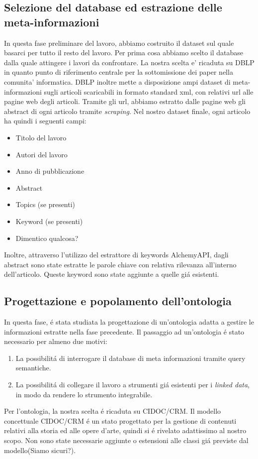 \documentclass[11pt,twoside,a4paper]{article}
\begin{document}
\subsection{Selezione del database ed estrazione delle meta-informazioni}
\label{subsec:infoextraction}
In questa fase preliminare del lavoro, abbiamo costruito il dataset sul quale basarci per tutto il resto del lavoro. Per prima cosa abbiamo scelto il database dalla quale attingere i lavori da confrontare. La nostra scelta e' ricaduta su DBLP\cite{DBLP} in quanto punto di riferimento centrale per la sottomissione dei paper nella comunita' informatica. DBLP inoltre mette a disposizione ampi dataset di meta-informazioni sugli articoli scaricabili in formato standard xml, con relativi url alle pagine web degli articoli.
Tramite gli url, abbiamo estratto dalle pagine web gli abstract di ogni articolo tramite \emph{scraping}. Nel nostro dataset finale, ogni articolo ha quindi i seguenti campi:
\begin{itemize}
	\item Titolo del lavoro
	\item Autori del lavoro
	\item Anno di pubblicazione
	\item Abstract
	\item Topics (se presenti)
	\item Keyword (se presenti)
	\item Dimentico qualcosa?
\end{itemize} 
Inoltre, attraverso l'utilizzo del estrattore di keywords AlchemyAPI, dagli abstract sono state estratte le parole chiave con relativa rilevanza all'interno dell'articolo. Queste keyword sono state aggiunte a quelle gi\'a esistenti.

\subsection{Progettazione e popolamento dell'ontologia}
\label{subsec:ontology}
In questa fase, \'e stata studiata la progettazione di un'ontologia adatta a gestire le informazioni estratte nella fase precedente. Il passaggio ad un'ontologia \'e stato necessario per almeno due motivi:
\begin{enumerate}
	\item La possibilit\'a di interrogare il database di meta informazioni tramite query semantiche.
	\item La possibilit\'a di collegare il lavoro a strumenti gi\'a esistenti per i \emph{linked data}, in modo da rendere lo strumento integrabile.
\end{enumerate}
Per l'ontologia, la nostra scelta \'e ricaduta su CIDOC/CRM\cite{CIDOC}. Il modello concettuale CIDOC/CRM \'e un stato progettato per la gestione di contenuti relativi alla storia ed alle opere d'arte, quindi si \'e rivelato adattissimo al nostro scopo. Non sono state necessarie aggiunte o estensioni alle classi gi\'a previste dal modello(Siamo sicuri?).
\end{document}

